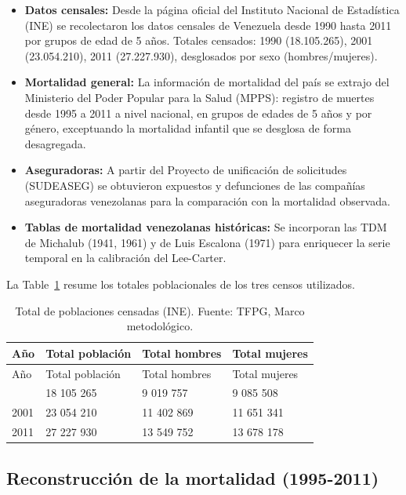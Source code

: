 \documentclass[
  11pt,
  a4paper,
]{article}
\begin{document}
\begin{itemize}
\item
  \textbf{Datos censales:} Desde la página oficial del Instituto
  Nacional de Estadística (INE) se recolectaron los datos censales de
  Venezuela desde 1990 hasta 2011 por grupos de edad de 5 años. Totales
  censados: 1990 (18.105.265), 2001 (23.054.210), 2011 (27.227.930),
  desglosados por sexo (hombres/mujeres).
\item
  \textbf{Mortalidad general:} La información de mortalidad del país se
  extrajo del Ministerio del Poder Popular para la Salud (MPPS):
  registro de muertes desde 1995 a 2011 a nivel nacional, en grupos de
  edades de 5 años y por género, exceptuando la mortalidad infantil que
  se desglosa de forma desagregada.
\item
  \textbf{Aseguradoras:} A partir del Proyecto de unificación de
  solicitudes (SUDEASEG) se obtuvieron expuestos y defunciones de las
  compañías aseguradoras venezolanas para la comparación con la
  mortalidad observada.
\item
  \textbf{Tablas de mortalidad venezolanas históricas:} Se incorporan
  las TDM de Michalub (1941, 1961) y de Luis Escalona (1971) para
  enriquecer la serie temporal en la calibración del Lee-Carter.
\end{itemize}

La Table~\ref{tbl-censos} resume los totales poblacionales de los tres
censos utilizados.

\begin{longtable}[]{@{}llll@{}}
\caption{Total de poblaciones censadas (INE). Fuente: TFPG, Marco
metodológico.}\label{tbl-censos}\tabularnewline
\toprule\noalign{}
Año & Total población & Total hombres & Total mujeres \\
\midrule\noalign{}
\endfirsthead
\toprule\noalign{}
Año & Total población & Total hombres & Total mujeres \\
\midrule\noalign{}
\endhead
\bottomrule\noalign{}
\endlastfoot
1990 & 18 105 265 & 9 019 757 & 9 085 508 \\
2001 & 23 054 210 & 11 402 869 & 11 651 341 \\
2011 & 27 227 930 & 13 549 752 & 13 678 178 \\
\end{longtable}

\subsection{Reconstrucción de la mortalidad
(1995-2011)}\label{reconstrucciuxf3n-de-la-mortalidad-1995-2011}
\end{document}
